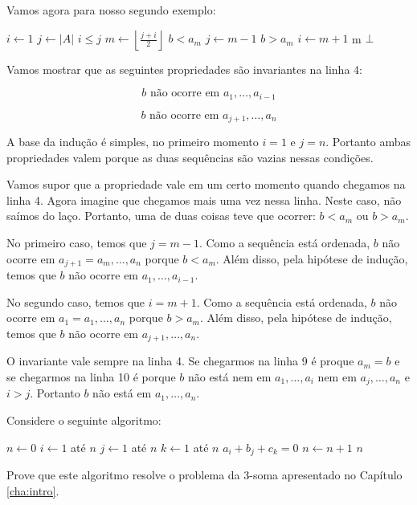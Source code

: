 Vamos agora para nosso segundo exemplo:


\begin{codebox}
  \li $i \gets 1$
  \li $j \gets |A|$
  \li \While $i \leq j$
  \li \Do $m \gets \left \lfloor{\frac{j+i}{2}}\right\rfloor$
  \li \If $b < a_m$
  \li     \Then $j \gets m - 1$
  \li \Else
      \If $b > a_m$
  \li      \Then $i \gets m + 1$
  \li \Else \Return m 
      \End
  \End
  \End
  \li \Return $\bot$
\end{codebox}

Vamos mostrar que as seguintes propriedades são invariantes na linha 4:

\begin{displaymath}
b \textrm{ não ocorre em } a_1, \dots, a_{i-1}
\end{displaymath}

\begin{displaymath}
b \textrm{ não ocorre em } a_{j+1}, \dots, a_n
\end{displaymath}

A base da indução é simples, no primeiro momento $i = 1$ e $j = n$.
Portanto ambas propriedades valem porque as duas sequências são vazias nessas condições.

Vamos supor que a propriedade vale em um certo momento quando chegamos na linha 4.
Agora imagine que chegamos mais uma vez nessa linha.
Neste caso, não saímos do laço.
Portanto, uma de duas coisas teve que ocorrer:
$b < a_m$ ou $b >a_m$.

No primeiro caso, temos que $j = m-1$.
Como a sequência está ordenada, $b$ não ocorre em $a_{j+1} = a_m, \dots, a_n$ porque $b < a_m$.
Além disso, pela hipótese de indução, temos que $b$ não ocorre em $a_1, \dots, a_{i-1}$.

No segundo caso, temos que $i = m+1$.
Como a sequência está ordenada, $b$ não ocorre em $a_{1} = a_{1}, \dots, a_n$ porque $b > a_m$.
Além disso, pela hipótese de indução, temos que $b$ não ocorre em $a_{j+1}, \dots, a_n$.

O invariante vale sempre na linha 4.
Se chegarmos na linha 9 é proque $a_m = b$ e se chegarmos na linha 10 é porque $b$ não está nem em $a_1, \dots, a_i$ nem em $a_j, \dots, a_n$ e $i > j$.
Portanto $b$ não está em $a_1, \dots, a_n$.

\vspace{2cm}

\begin{exercicio}
  Considere o seguinte algoritmo:

\begin{codebox}
  \li $n \gets 0$
  \li \For $i \gets 1$ até $n$
  \li \Do \For $j \gets 1$ até $n$
  \li     \Do \For $k \gets 1$ até $n$
  \li         \If $a_i + b_j + c_k = 0$
  \li         \Then $n \gets n + 1$
  \End
  \End
  \End
  \li \Return $n$
\end{codebox}

Prove que este algoritmo resolve o problema da 3-soma apresentado no Capítulo \ref{cha:intro}.
  
\end{exercicio}
